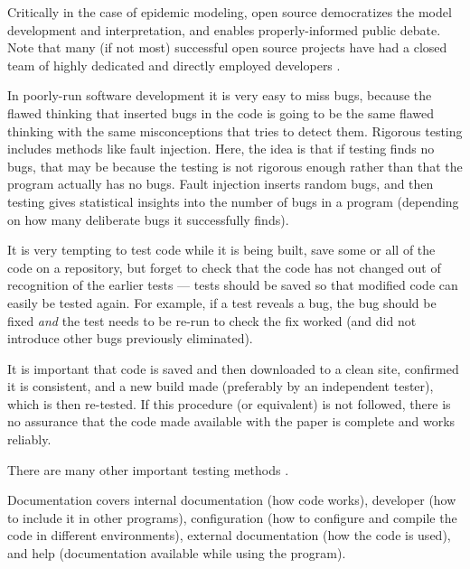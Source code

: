 \documentclass{article}
\begin{document}
Critically in the case of epidemic modeling, open source democratizes the model development and interpretation, and enables properly-informed public debate. Note that many (if not most) successful open source projects have had a closed team of highly dedicated and directly employed developers \cite{open-source}. 

In poorly-run software development it is very easy to miss bugs, because the flawed thinking that inserted bugs in the code is going to be the same flawed thinking with the same misconceptions that tries to detect them. Rigorous testing includes methods like fault injection. Here, the idea is that if testing finds no bugs, that may be because the testing is not rigorous enough rather than that the program actually has no bugs. Fault injection inserts random bugs, and then testing gives statistical insights into the number of bugs in a program (depending on how many deliberate bugs it successfully finds). 

It is very tempting to test code while it is being built, save some or all of the code on a repository, but forget to check that the code has not changed out of recognition of the earlier tests --- tests should be saved so that modified code can easily be tested again. For example, if a test reveals a bug, the bug should be fixed \emph{and\/} the test needs to be re-run to check the fix worked (and did not introduce other bugs previously eliminated). 

It is important that code is saved and then downloaded to a clean site, confirmed it is consistent, and a new build made (preferably by an independent tester), which is then re-tested. If this procedure (or equivalent) is not followed, there is no assurance that the code made available with the paper is complete and works reliably.

There are many other important testing methods \cite{sommerville,knight,NVP}.

Documentation covers internal documentation (how code works), developer (how to include it in other programs), configuration (how to configure and compile the code in different environments), external documentation (how the code is used), and help (documentation available while using the program). 
\end{document}
